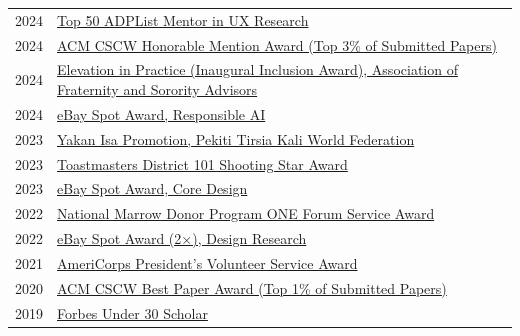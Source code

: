 \documentclass[12pt]{article}
\begin{document}
{\begin{longtable}{R{0.75in}p{5.0in}}
\footnotesize{2024} & 
\href{https://adplist.org/community-certifications/top50-dec-2024-ux-research-a39307}{Top 50 ADPList Mentor in UX Research}\\

\footnotesize{2024} & 
\href{https://cscw.acm.org/2024/index.php/awards/}{ACM CSCW Honorable Mention Award (Top 3\% of Submitted Papers)}\\

\footnotesize{2024} & 
\href{https://www.facebook.com/AFA1976/videos/1373580967342312}{Elevation in Practice (Inaugural Inclusion Award), Association of Fraternity and Sorority Advisors}\\

\footnotesize{2024} & 
\href{https://ebay.design/about#ux-research}{eBay Spot Award, Responsible AI}\\

\footnotesize{2023} & 
\href{https://www.facebook.com/PTK.Elite/posts/pfbid0334DeNzPG48z59rssnxWKtzSdgPXmRXjLGGYqxbyWtdVJtQ31cxXErfckGbbASDb7l}{Yakan Isa Promotion, Pekiti Tirsia Kali World Federation}\\

\footnotesize{2023} & 
\href{https://d101tm.org/the-luncheon-in-july/}{Toastmasters District 101 Shooting Star Award}\\

\footnotesize{2023} & 
\href{https://ebay.design/about#ux-research}{eBay Spot Award, Core Design}\\

\footnotesize{2022} & 
\href{https://www.youtube.com/watch?v=MlA4KEbI1Gw}{National Marrow Donor Program ONE Forum Service Award}\\

\footnotesize{2022} & 
\href{https://ebay.design/about#ux-research}{eBay Spot Award (2×), Design Research}\\

\footnotesize{2021} & 
\href{https://presidentialserviceawards.gov/}{AmeriCorps President's Volunteer Service Award}\\

\footnotesize{2020} & 
\href{https://cscw.acm.org/2020/awards/}{ACM CSCW Best Paper Award (Top 1\% of Submitted Papers)}\\

\footnotesize{2019} & 
\href{https://www.forbes.com/sites/forbespr/2017/09/12/forbes-under-30-scholars-program-focused-on-diversity-and-inclusion-offers-1000-college-students-access-to-2017-forbes-under-30-summit/}{Forbes Under 30 Scholar}\\


\end{longtable}}
\end{document}

